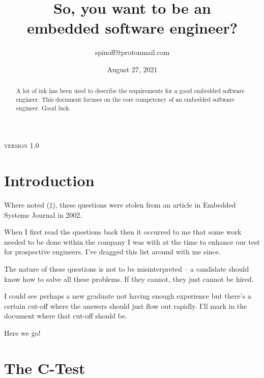 \documentclass[12pt]{article}
\author{spinoff@protonmail.com}
\date{August 27, 2021}
\title{So, you want to be an \\embedded software engineer?}
\begin{document}
\begin{titlingpage}
\maketitle
\begin{abstract}
A lot of ink has been used to describe the requirements for
a good embedded software engineer.  This document focuses on the core
competency of an embedded software engineer. Good luck.
\end{abstract}
\par
\vskip1cm
{\textsc{version 1.0}}
\vskip5mm

\end{titlingpage}

\section{Introduction}

Where noted ($\ddagger$), these questions were stolen from an article
in Embedded Systems Journal in 2002.

When I first read the questions back then it occurred to me that some work needed to be
done within the company I was with at the time to enhance our test for prospective 
engineers.  I've dragged this list around with me since.

The nature of these questions is not to be misinterpreted -- a candidate should know
how to solve all these problems. If they cannot, they just cannot be hired.

I could see perhaps a new graduate not having enough experience but there's a certain
cut-off where the answers should just flow out rapidly.  I'll mark in the document
where that cut-off should be.


Here we go! 

\section{The C-Test}
\end{document}
